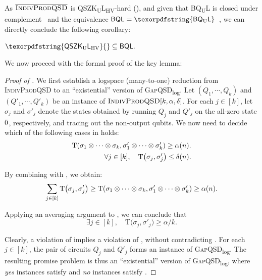 \documentclass[10pt,a4paper]{article}
\numberwithin{equation}{section}
\numberwithin{figure}{section}
\newcommand{\QSZKULHV}{\texorpdfstring{\textnormal{\textsf{QSZK}\textsubscript{\textnormal{U}}\textsf{L}}\textsubscript{\textnormal{HV}}}\xspace}
\newcommand{\BQL}{\textnormal{\textsf{BQL}}\xspace}
\newcommand{\BQUL}{\texorpdfstring{\textnormal{\textsf{BQ}\textsubscript{U}\textsf{L}}}\xspace}
\newcommand{\textoverline}[1]{$\overline{\mbox{#1}}$}
\newcommand{\GapQSDlog}{\texorpdfstring{\textnormal{\textsc{GapQSD}\textsubscript{log}}}\xspace}
\newcommand{\IndivProdQSD}{\textnormal{\textsc{IndivProdQSD}}\xspace}
\newcommand{\coIndivProdQSD}{\texorpdfstring{\textnormal{\textoverline{\textsc{IndivProdQSD}}}}\xspace}
\DeclarePairedDelimiter\rbra{\lparen}{\rparen}
\let\ket\relax\DeclarePairedDelimiter\ket{\lvert}{\rangle}
\newcommand{\td}{\mathrm{T}}
\begin{document}
As \coIndivProdQSD{} is \QSZKULHV{}-hard (), and given that \BQUL{} is closed under complement~\cite[Corollary 4.8]{Wat99} and the equivalence $\BQL=\BQUL$~\cite{FR21}, we can directly conclude the following corollary:

\begin{corollary}
    $\QSZKULHV{} \subseteq \BQL{}.$
\end{corollary}

We now proceed with the formal proof of the key lemma: 

\begin{proof}[Proof of ]
    We first establish a logspace (many-to-one) reduction from \IndivProdQSD{} to an ``existential'' version of \GapQSDlog{}. 
    Let $(Q_1,\cdots,Q_k)$ and $(Q'_1,\cdots,Q'_k)$ be an instance of $\IndivProdQSD[k,\alpha,\delta]$. For each $j\in[k]$, let $\sigma_j$ and $\sigma'_j$ denote the states obtained by running $Q_j$ and $Q'_j$ on the all-zero state $\ket{\bar{0}}$, respectively, and tracing out the non-output qubits. We now need to decide which of the following cases in  holds: 
    \begin{align}
        \td\rbra*{\sigma_1\otimes \cdots \otimes \sigma_k, \sigma'_1\otimes \cdots \otimes \sigma'_k} \geq \alpha(n). \label{eq:IndivProdQSD-far}\\
        \forall j \in [k], \quad \td\big(\sigma_j, \sigma'_j\big) \leq \delta(n) \label{eq:IndivProdQSD-close}.
    \end{align}

    By combining  with , we obtain: 
    \begin{equation}
        \label{eq:IndivProdQSD-farE}
        \sum_{j\in[k]} \td\big(\sigma_j, \sigma'_j\big) \geq 
        \td\rbra*{\sigma_1\otimes \cdots \otimes \sigma_k, \sigma'_1\otimes \cdots \otimes \sigma'_k} \geq \alpha(n).
    \end{equation}

    Applying an averaging argument to , we can conclude that
    \begin{equation}
        \label{eq:IndivProdQSD-far-invidual}
        \exists j\in[k], \quad \td\big(\sigma_j, \sigma'_j\big) \geq \alpha/k. 
    \end{equation}
    
    Clearly, a violation of  implies a violation of , without contradicting . 
    For each $j\in[k]$, the pair of circuits $Q_j$ and $Q'_j$ forms an instance of \GapQSDlog{}. The resulting promise problem is thus an ``existential'' version of \GapQSDlog{}, where \textit{yes} instances satisfy  and \textit{no} instances satisfy . 


\end{proof}
\end{document}
